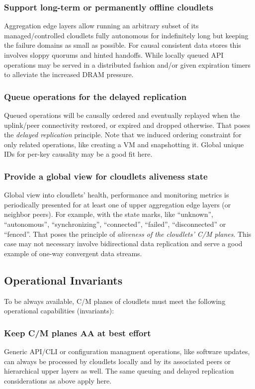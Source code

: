\documentclass[conference]{IEEEtran}
\begin{document}
\subsubsection{Support long-term or permanently offline cloudlets}
Aggregation edge layers allow running an arbitrary subset of its
managed/controlled cloudlets fully autonomous for indefinitely long but keeping
the failure domains as small as possible. For causal consistent data stores
this involves sloppy quorums and hinted handoffs\cite{b17}. While locally
queued API operations may be served in a distributed fashion and/or given
expiration timers to alleviate the increased DRAM pressure.

\subsubsection{Queue operations for the delayed replication}
Queued operations will be causally ordered and eventually replayed when the
uplink/peer connectivity restored, or expired and dropped otherwise. That poses
the \textit{delayed replication} principle. Note that we induced ordering
constraint for only related operations, like creating a VM and snapshotting it.
Global unique IDs for per-key causality may be a good fit here.

\subsubsection{Provide a global view for cloudlets aliveness state}
Global view into cloudlets' health, performance and monitoring metrics is
periodically presented for at least one of upper aggregation edge layers (or
neighbor peers). For example, with the state marks, like ``unknown'',
``autonomous'', ``synchronizing'', ``connected'', ``failed'', ``disconnected''
or ``fenced''. That poses the principle of \textit{aliveness of the cloudlets'
C/M planes}. This case may not necessary involve bidirectional data
replication and serve a good example of one-way convergent data streams.

\subsection{Operational Invariants}
To be always available, C/M planes of cloudlets must meet the following
operational capabilities (invariants):

\subsubsection{Keep C/M planes AA at best effort}
Generic API/CLI or configuration managment operations, like software updates,
can always be processed by cloudlets locally and by its associated peers or
hierarchical upper layers as well. The same queuing and delayed replication
considerations as above apply here.
\end{document}
